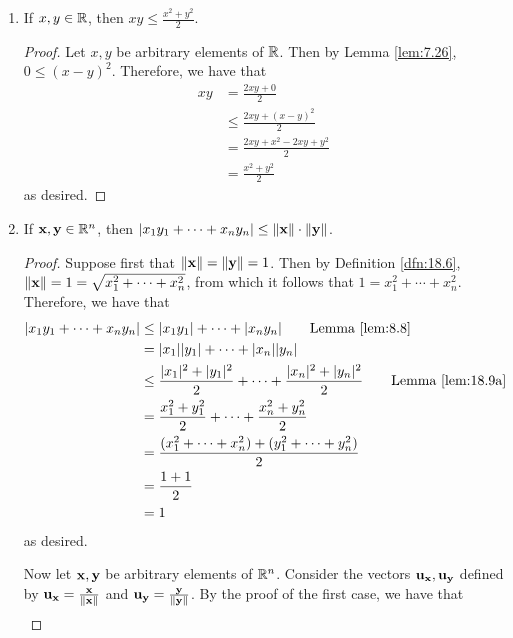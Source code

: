 \documentclass[../main.tex]{subfiles}
\begin{document}
\begin{lemma}\label{lem:18.9}
    \leavevmode
    \begin{enumerate}[label=\textup{(}\alph*\textup{)},ref={\thelemma\alph*}]
        \item \label{lem:18.9a}If $x,y\in\mathbb{R}$, then $xy\leq\frac{x^2+y^2}{2}$.
        \begin{proof}
            Let $x,y$ be arbitrary elements of $\mathbb{R}$. Then by Lemma \ref{lem:7.26}, $0\leq(x-y)^2$. Therefore, we have that
            \begin{align*}
                xy &= \frac{2xy+0}{2}\\
                &\leq \frac{2xy+(x-y)^2}{2}\\
                &= \frac{2xy+x^2-2xy+y^2}{2}\\
                &= \frac{x^2+y^2}{2}
            \end{align*}
            as desired.
        \end{proof}
        \item \label{lem:18.9b}If $\mathbf{x},\mathbf{y}\in\mathbb{R}^n$, then $|x_1y_1+\cdots+x_ny_n|\leq\norm{\mathbf{x}}\cdot\norm{\mathbf{y}}$.
        \begin{proof}
            Suppose first that $\norm{\mathbf{x}}=\norm{\mathbf{y}}=1$. Then by Definition \ref{dfn:18.6}, $\norm{\mathbf{x}}=1=\sqrt{x_1^2+\cdots+x_n^2}$, from which it follows that $1=x_1^2+\cdots+x_n^2$. Therefore, we have that
            \begin{align*}
                |x_1y_1+\cdots+x_ny_n| &\leq |x_1y_1|+\cdots+|x_ny_n|\tag*{Lemma \ref{lem:8.8}}\\
                &= |x_1||y_1|+\cdots+|x_n||y_n|\\
                &\leq \frac{|x_1|^2+|y_1|^2}{2}+\cdots+\frac{|x_n|^2+|y_n|^2}{2}\tag*{Lemma \ref{lem:18.9a}}\\
                &= \frac{x_1^2+y_1^2}{2}+\cdots+\frac{x_n^2+y_n^2}{2}\\
                &= \frac{(x_1^2+\cdots+x_n^2)+(y_1^2+\cdots+y_n^2)}{2}\\
                &= \frac{1+1}{2}\\
                &= 1
            \end{align*}
            as desired.\par
            Now let $\mathbf{x},\mathbf{y}$ be arbitrary elements of $\mathbb{R}^n$. Consider the vectors $\mathbf{u}_{\mathbf{x}},\mathbf{u}_{\mathbf{y}}$ defined by $\mathbf{u}_{\mathbf{x}}=\frac{\mathbf{x}}{\norm{\mathbf{x}}}$ and $\mathbf{u}_{\mathbf{y}}=\frac{\mathbf{y}}{\norm{\mathbf{y}}}$. By the proof of the first case, we have that
            \begin{align*}

\end{align*}
\end{proof}
\end{enumerate}
\end{lemma}
\end{document}
